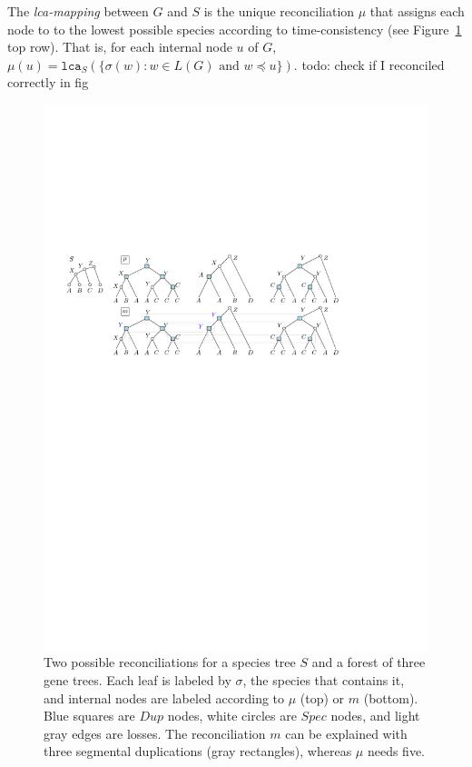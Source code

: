 \documentclass[10pt]{article}
\newcommand{\lca}{\texttt{lca}}
\newcommand{\ml}[1]{\begingroup\color{blue}#1\endgroup}
\begin{document}
The \emph{lca-mapping} between $G$ and $S$ is the unique reconciliation $\mu$ that assigns each node to to the lowest possible species according to time-consistency (see Figure~\ref{fig:fig1} top row).  That is, for each internal node $u$ of $G$, 
$\mu(u) = \lca_S( \{ \sigma(w) : w \in L(G) \mbox{ and } w \preceq u \} )$.  \ml{todo: check if I reconciled correctly in fig}


\begin{figure}[htb]
    \centering
    \includegraphics[width=0.8\linewidth]{figs_theory/fig1.pdf}
    \caption{Two possible reconciliations for a species tree $S$ and a forest of three gene trees.  Each leaf is labeled by $\sigma$, the species that contains it, and internal nodes are labeled according to $\mu$ (top) or $m$ (bottom).
    Blue squares are $Dup$ nodes, white circles are $Spec$ nodes, and light gray edges are losses.
    The reconciliation $m$ can be explained with three segmental duplications (gray rectangles), whereas $\mu$ needs five.
    }
    \label{fig:fig1}
\end{figure}
\end{document}
